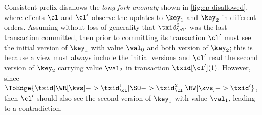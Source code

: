 Consistent prefix disallows the \emph{long fork anomaly} shown in \cref{fig:cp-disallowed}, 
where clients \(\cl\) and \(\cl'\) observe the updates to \(\key_1\) and \(\key_2\) 
in different orders. 
Assuming without loss of generality that \( \txid_{\cl'}^{2} \) was the last transaction committed, 
then prior to committing its transaction \(\cl'\) must see 
the initial version of \(\key_1\) with value \(\val_0\) and both version of \( \key_2 \);
this is because a view must always include the initial versions and \( \cl' \) read the second version 
of \( \key_2 \) carrying value \( \val_2 \) in transaction \( \txid[\cl'](1)\).
However, since 
\( \ToEdge{ \txid | \WR[\kvs] -> \txid_{\cl}^{1} | \SO
            -> \txid_{\cl}^{2} | \RW[\kvs] -> \txid' } \),
then \(\cl'\) should also see the second version of \(\key_1\) with value \(\val_1\), 
leading to a contradiction.

